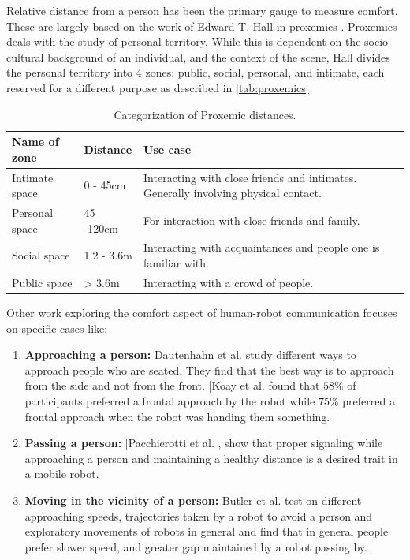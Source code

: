  Relative distance from a person has been the primary gauge to measure comfort. These are largely based on the work of Edward T. Hall in proxemics \cite{proxemics_hall_1968}. Proxemics deals with the study of personal territory. While this is dependent on the socio-cultural background of an individual, and the context of the scene, Hall divides the personal territory into 4 zones: public, social, personal, and intimate, each reserved for a different purpose as described in \autoref{tab:proxemics}
\begin{table}
    \begin{center}
        \renewcommand{\arraystretch}{1.3}
        \begin{tabular}{|p{}|p{}|p{}|}
            \hline
            Name of zone & Distance & Use case \\
            \hline\hline
            Intimate space & 0 - 45cm &  Interacting with close friends and intimates. Generally involving physical contact.\\
            Personal space & 45 -120cm &  For interaction with close friends and family. \\
            Social space & 1.2 - 3.6m &  Interacting with acquaintances and people one is familiar with.\\
            Public space & > 3.6m &  Interacting with a crowd of people.\\
            \hline
        \end{tabular}
        \caption{Categorization of Proxemic distances.}
        \label{tab:proxemics}
    \end{center}
\end{table}
Other work exploring the comfort aspect of human-robot communication focuses on specific cases like:
\begin{enumerate}
    \item \textbf{Approaching a person:} Dautenhahn et al. \cite{dautenhahn_2006}  study different ways to approach people who are seated. They find that the best way is to approach from the side and not from the front.
    [Koay et al. \cite{koay2007ExploratorySO}  found that $58\%$ of participants preferred a frontal approach by the robot while $75\%$ preferred a frontal approach when the robot was handing them something.
    \item \textbf{Passing a person:} [Pacchierotti et al. \cite{pacchierotti_2006} \cite{pacchierotti_2005},  show that proper signaling while approaching a person and maintaining a healthy distance is a desired trait in a mobile robot.
    \item \textbf{Moving in the vicinity of a person:}  Butler et al. \cite{butler_2001} test on different approaching speeds, trajectories taken by a robot to avoid a person and exploratory movements of robots in general and find that in general people prefer slower speed, and greater gap maintained by a robot passing by.
\end{enumerate}

